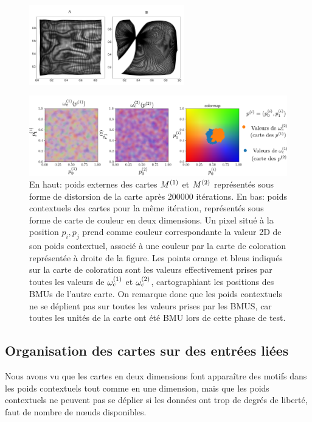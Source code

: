 \documentclass[../main]{subfiles}
\begin{document}
\begin{figure}
	\begin{minipage}{\textwidth}
		\centering\includegraphics[width=0.6\textwidth]{we_cub_example.pdf}
		\label{fig:2som_cub_we}
	\end{minipage}
	\begin{minipage}{\textwidth}
		\includegraphics[width=\textwidth]{wc_cub_legend.pdf}
		\caption{En haut: poids externes des cartes $M^{({1})}$ et $M^{({2})}$ représentés sous forme de distorsion de la carte après 200000 itérations.
	En bas: poids contextuels des cartes pour la même itération, représentés sous forme de carte de couleur en deux dimensions. Un pixel situé à la position $p_i,p_j$ prend comme couleur correspondante la valeur 2D de son poids contextuel, associé à une couleur par la carte de coloration représentée à droite de la figure.
	Les points orange et bleus indiqués sur la carte de coloration sont les valeurs effectivement prises par toutes les valeurs de $\omega_c^{(1)}$ et $\omega_c^{(2)}$, cartographiant les positions des BMUs de l'autre carte.
	On remarque donc que les poids contextuels ne se déplient pas sur toutes les valeurs prises par les BMUS, car toutes les unités de la carte ont été BMU lors de cette phase de test.\label{fig:2som_cub_wc}}
	\end{minipage}
\end{figure}

\subsection{Organisation des cartes sur des entrées liées}

Nous avons vu que les cartes en deux dimensions font apparaître des motifs dans les poids contextuels tout comme en une dimension, mais que les poids contextuels ne peuvent pas se déplier si les données ont trop de degrés de liberté, faut de nombre de n\oe{}uds disponibles.
\end{document}
